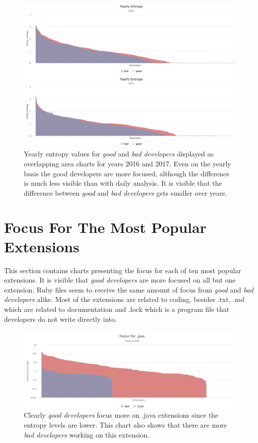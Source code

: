 \begin{figure}[htpb]
  \centering
  \includegraphics[width=1\textwidth]{figures/yearly_2016-17}
  \caption[Yearly Focus Chart for 2016 and 2017]{Yearly entropy values for \textit{good} and \textit{bad developers} displayed as overlapping area charts for years 2016 and 2017. Even on the yearly basis the good developers are more focused, although the difference is much less visible than with daily analysis. It is visible that the difference between \textit{good} and \textit{bad developers} gets smaller over years. } \label{fig:yearly_2016-17}
\end{figure}

\section{Focus For The Most Popular Extensions}

This section contains charts presenting the focus for each of ten most popular extensions. It is visible that \textit{good developers} are more focused on all but one extension. Ruby files seem to receive the same amount of focus from \textit{good} and \textit{bad developers} alike. Most of the extensions are related to coding, besides .txt, .md which are related to documentation and .lock which is a program file that developers do not write directly into.

\begin{figure}[htpb]
  \centering
  \includegraphics[width=1\textwidth]{figures/java_log}
  \caption[Focus Chart for .java]{Clearly \textit{good developers} focus more on .java extensions since the entropy levels are lower. This chart also shows that there are more \textit{bad developers} working on this extension.} \label{fig:java_log_appendix}
\end{figure}

